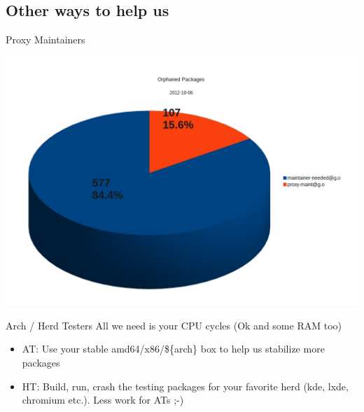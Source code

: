 \subsection{Other ways to help us}
\begin{frame}{Proxy Maintainers}
	\begin{center}
	\includegraphics[scale=0.28]{orphaned_packages.png}
	\end{center}
\end{frame}

\begin{frame}{Arch / Herd Testers}
All we need is your CPU cycles (Ok and some RAM too)
	\begin{itemize}
	\item AT: Use your stable amd64/x86/\$\{arch\} box to help us stabilize more packages
	\item HT: Build, run, crash the testing packages for your favorite herd (kde, lxde, chromium etc.). Less work for ATs ;-)
	\end{itemize}
\end{frame}

